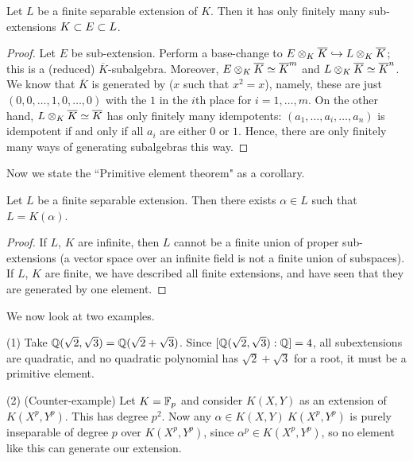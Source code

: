 \begin{thm}
Let $L$ be a finite separable extension of $K$.
Then it has only finitely many sub-extensions $K \subset E \subset L$.
\end{thm}
\begin{proof}
Let $E$ be sub-extension. 
Perform a base-change to $E \otimes_{K} \overline{K} \hookrightarrow L \otimes_{K} \overline{K}$; this is a (reduced) $\overline{K}$-subalgebra.
Moreover, $E \otimes_{K} \overline{K} \simeq \overline{K}^m$ and $L \otimes_{K} \overline{K} \simeq \overline{K}^n$.
We know that $\overline{K}$ is generated by  ($x$ such that $x^2 = x$), namely, these are just $(0, 0, \dotsc, 1, 0, \dotsc, 0)$ with the $1$ in the $i$th place for $i = 1, \dotsc, m$.
On the other hand, $L \otimes_{K} \overline{K} \simeq \overline{K}$ has only finitely many idempotents: $(a_1, \dotsc, a_i, \dotsc, a_n)$ is idempotent if and only if all $a_i$ are either $0$ or $1$.
Hence, there are only finitely many ways of generating subalgebras this way.
\end{proof}

Now we state the ``Primitive element theorem" as a corollary.

\begin{cor}
Let $L$ be a finite separable extension.
Then there exists $\alpha \in L$ such that $L = K(\alpha)$.
\end{cor}
\begin{proof}
If $L$, $K$ are infinite, then $L$ cannot be a finite union of proper sub-extensions (a vector space over an infinite field is not a finite union of subspaces).
If $L$, $K$ are finite, we have described all finite extensions, and have seen that they are generated by one element.
\end{proof}

We now look at two examples.

\begin{ex}
(1) Take $\mathbb{Q}(\sqrt{2}, \sqrt{3}) = \mathbb{Q}(\sqrt{2} + \sqrt{3})$. Since $[\mathbb{Q}(\sqrt{2}, \sqrt{3}) : \mathbb{Q} ] = 4$, all subextensions are quadratic, and no quadratic polynomial has $\sqrt{2} + \sqrt{3}$ for a root, it must be a primitive element.

(2) (Counter-example) Let $K = \mathbb{F}_p$ and consider $K(X, Y)$ as an extension of $K(X^p, Y^p)$.
This has degree $p^2$.
Now any $\alpha \in K(X, Y) \ K(X^p, Y^p)$ is purely inseparable of degree $p$ over $K(X^p, Y^p)$, since $\alpha^p \in K(X^p, Y^p)$, so no element like this can generate our extension.
\end{ex}


